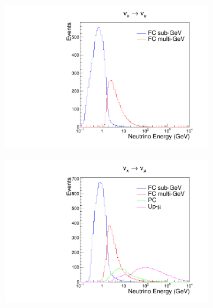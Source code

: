 \begin{figure}[h]
  \begin{subfigure}[t]{0.49\textwidth}
    \includegraphics[width=\textwidth, trim={0mm 0mm 0mm 0mm}, clip,page=1]{Figures/Selections/NeutrinoEnergyDist_NuE.pdf}
  \end{subfigure}%
  \begin{subfigure}[t]{0.49\textwidth}
    \includegraphics[width=\textwidth, trim={0mm 0mm 0mm 0mm}, clip,page=1]{Figures/Selections/NeutrinoEnergyDist_NuMu.pdf}
  \end{subfigure}
  \begin{subfigure}[t]{0.49\textwidth}

\end{subfigure}
\end{figure}

